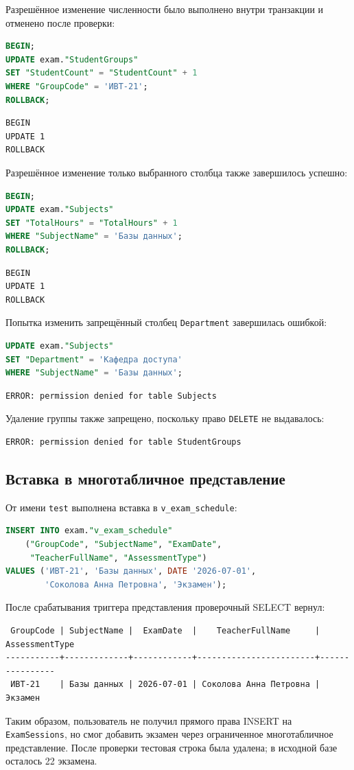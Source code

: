 \documentclass[12pt,a4paper]{article}
\begin{document}
Разрешённое изменение численности было выполнено внутри транзакции
и отменено после проверки:
\begin{lstlisting}[language=SQL]
BEGIN;
UPDATE exam."StudentGroups"
SET "StudentCount" = "StudentCount" + 1
WHERE "GroupCode" = 'ИВТ-21';
ROLLBACK;
\end{lstlisting}
\begin{lstlisting}
BEGIN
UPDATE 1
ROLLBACK
\end{lstlisting}
Разрешённое изменение только выбранного столбца также завершилось успешно:
\begin{lstlisting}[language=SQL]
BEGIN;
UPDATE exam."Subjects"
SET "TotalHours" = "TotalHours" + 1
WHERE "SubjectName" = 'Базы данных';
ROLLBACK;
\end{lstlisting}
\begin{lstlisting}
BEGIN
UPDATE 1
ROLLBACK
\end{lstlisting}

Попытка изменить запрещённый столбец \texttt{Department} завершилась ошибкой:
\begin{lstlisting}[language=SQL]
UPDATE exam."Subjects"
SET "Department" = 'Кафедра доступа'
WHERE "SubjectName" = 'Базы данных';
\end{lstlisting}
\begin{lstlisting}
ERROR: permission denied for table Subjects
\end{lstlisting}
Удаление группы также запрещено, поскольку право \texttt{DELETE} не выдавалось:
\begin{lstlisting}
ERROR: permission denied for table StudentGroups
\end{lstlisting}

\subsection*{Вставка в многотабличное представление}
От имени \texttt{test} выполнена вставка в \texttt{v\_exam\_schedule}:
\begin{lstlisting}[language=SQL]
INSERT INTO exam."v_exam_schedule"
    ("GroupCode", "SubjectName", "ExamDate",
     "TeacherFullName", "AssessmentType")
VALUES ('ИВТ-21', 'Базы данных', DATE '2026-07-01',
        'Соколова Анна Петровна', 'Экзамен');
\end{lstlisting}
После срабатывания триггера представления проверочный SELECT вернул:
\begin{lstlisting}
 GroupCode | SubjectName |  ExamDate  |    TeacherFullName     | AssessmentType
-----------+-------------+------------+------------------------+----------------
 ИВТ-21    | Базы данных | 2026-07-01 | Соколова Анна Петровна | Экзамен
\end{lstlisting}
Таким образом, пользователь не получил прямого права INSERT на
\texttt{ExamSessions}, но смог добавить экзамен через ограниченное
многотабличное представление. После проверки тестовая строка была удалена;
в исходной базе осталось 22 экзамена.
\end{document}
